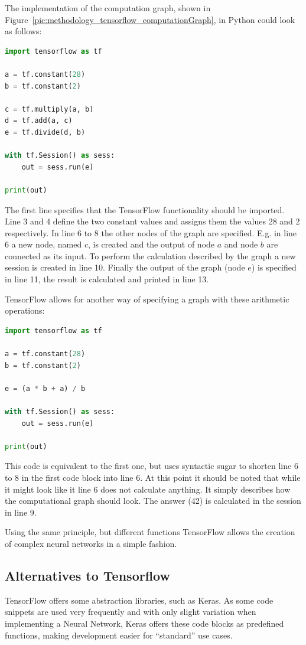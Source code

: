 The implementation of the computation graph, shown in Figure~\ref{pic:methodology_tensorflow_computationGraph}, in Python could look as follows:

\newpage

\begin{lstlisting}[language=python]
import tensorflow as tf

a = tf.constant(28)
b = tf.constant(2)

c = tf.multiply(a, b)
d = tf.add(a, c)
e = tf.divide(d, b)

with tf.Session() as sess:
    out = sess.run(e)

print(out)
\end{lstlisting}

The first line specifies that the TensorFlow functionality should be imported. Line 3 and 4 define the two constant values and assigns them the values 28 and 2 respectively. In line 6 to 8 the other nodes of the graph are specified. E.g. in line 6 a new node, named $c$, is created and the output of node $a$ and node $b$ are connected as its input. To perform the calculation described by the graph a new session is created in line 10. Finally the output of the graph (node $e$) is specified in line 11, the result is calculated and printed in line 13.

TensorFlow allows for another way of specifying a graph with these arithmetic operations:

\begin{lstlisting}[language=python]
import tensorflow as tf

a = tf.constant(28)
b = tf.constant(2)

e = (a * b + a) / b

with tf.Session() as sess:
    out = sess.run(e)

print(out)
\end{lstlisting}

This code is equivalent to the first one, but uses syntactic sugar to shorten line 6 to 8 in the first code block into line 6. At this point it should be noted that while it might look like it line 6 does not calculate anything. It simply describes how the computational graph should look. The answer (42) is calculated in the session in line 9.

Using the same principle, but different functions TensorFlow allows the creation of complex neural networks in a simple fashion.

\newpage

\subsection{Alternatives to Tensorflow}
TensorFlow offers some abstraction libraries, such as Keras. As some code snippets are used very frequently and with only slight variation when implementing a Neural Network, Keras offers these code blocks as predefined functions, making development easier for ``standard'' use cases.

